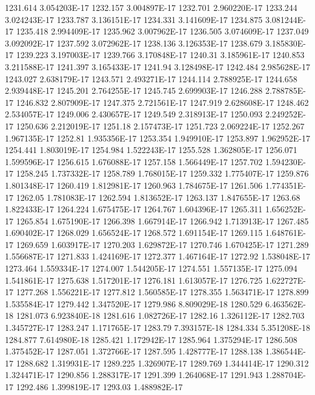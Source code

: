 1231.614  3.054203E-17
1232.157  3.004897E-17
1232.701  2.960220E-17
1233.244  3.024243E-17
1233.787  3.136151E-17
1234.331  3.141609E-17
1234.875  3.081244E-17
1235.418  2.994409E-17
1235.962  3.007962E-17
1236.505  3.074609E-17
1237.049  3.092092E-17
1237.592  3.072962E-17
1238.136  3.126353E-17
1238.679  3.185830E-17
1239.223  3.197003E-17
1239.766  3.170848E-17
1240.31  3.185961E-17
1240.853  3.211588E-17
1241.397  3.165433E-17
1241.94  3.128498E-17
1242.484  2.985628E-17
1243.027  2.638179E-17
1243.571  2.493271E-17
1244.114  2.788925E-17
1244.658  2.939448E-17
1245.201  2.764255E-17
1245.745  2.699903E-17
1246.288  2.788785E-17
1246.832  2.807909E-17
1247.375  2.721561E-17
1247.919  2.628608E-17
1248.462  2.534057E-17
1249.006  2.430657E-17
1249.549  2.318913E-17
1250.093  2.249252E-17
1250.636  2.212019E-17
1251.18  2.157473E-17
1251.723  2.069224E-17
1252.267  1.967135E-17
1252.81  1.935356E-17
1253.354  1.949910E-17
1253.897  1.962952E-17
1254.441  1.803019E-17
1254.984  1.522243E-17
1255.528  1.362805E-17
1256.071  1.599596E-17
1256.615  1.676088E-17
1257.158  1.566449E-17
1257.702  1.594230E-17
1258.245  1.737332E-17
1258.789  1.768015E-17
1259.332  1.775407E-17
1259.876  1.801348E-17
1260.419  1.812981E-17
1260.963  1.784675E-17
1261.506  1.774351E-17
1262.05  1.781083E-17
1262.594  1.813652E-17
1263.137  1.847655E-17
1263.68  1.822433E-17
1264.224  1.675475E-17
1264.767  1.604396E-17
1265.311  1.656252E-17
1265.854  1.675190E-17
1266.398  1.667914E-17
1266.942  1.713913E-17
1267.485  1.690402E-17
1268.029  1.656524E-17
1268.572  1.691154E-17
1269.115  1.648761E-17
1269.659  1.603917E-17
1270.203  1.629872E-17
1270.746  1.670425E-17
1271.289  1.556687E-17
1271.833  1.424169E-17
1272.377  1.467164E-17
1272.92  1.538048E-17
1273.464  1.559334E-17
1274.007  1.544205E-17
1274.551  1.557135E-17
1275.094  1.541861E-17
1275.638  1.517201E-17
1276.181  1.613057E-17
1276.725  1.622727E-17
1277.268  1.556221E-17
1277.812  1.560585E-17
1278.355  1.563471E-17
1278.899  1.535584E-17
1279.442  1.347520E-17
1279.986  8.809029E-18
1280.529  6.463562E-18
1281.073  6.923840E-18
1281.616  1.082726E-17
1282.16  1.326112E-17
1282.703  1.345727E-17
1283.247  1.171765E-17
1283.79  7.393157E-18
1284.334  5.351208E-18
1284.877  7.614980E-18
1285.421  1.172942E-17
1285.964  1.375294E-17
1286.508  1.375452E-17
1287.051  1.372766E-17
1287.595  1.428777E-17
1288.138  1.386544E-17
1288.682  1.319931E-17
1289.225  1.326907E-17
1289.769  1.344414E-17
1290.312  1.324471E-17
1290.856  1.288317E-17
1291.399  1.264068E-17
1291.943  1.288704E-17
1292.486  1.399819E-17
1293.03  1.488982E-17
